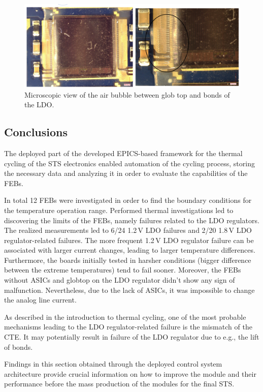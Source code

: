 \begin{figure}[!h]
\centering
\includegraphics[width=0.8\columnwidth]{Chapter4/images/FEB_81_LDO_lift.png}
\caption{Microscopic view of the air bubble between glob top and bonds of the \gls{LDO}.}
\label{fig_ldo_lift}
\end{figure}
\newpage
\subsection{Conclusions}
The deployed part of the developed EPICS-based framework for the thermal cycling of the \gls{STS} electronics enabled automation of the cycling process, storing the necessary data and analyzing it in order to evaluate the capabilities of the \glspl{FEB}. 

In total 12 \glspl{FEB} were investigated in order to find the boundary conditions for the temperature operation range. Performed thermal investigations led to discovering the limits of the \glspl{FEB}, namely failures related to the \gls{LDO} regulators. The realized measurements led to 6/24 1.2\,V \gls{LDO} failures and 2/20 1.8\,V \gls{LDO} regulator-related failures. The more frequent 1.2\,V \gls{LDO} regulator failure can be associated with larger current changes, leading to larger temperature differences. Furthermore, the boards initially tested in harsher conditions (bigger difference between the extreme temperatures) tend to fail sooner. Moreover, the \glspl{FEB} without \glspl{ASIC} and globtop on the LDO regulator didn’t show any sign of malfunction. Nevertheless, due to the lack of \glspl{ASIC}, it was impossible to change the analog line current.

As described in the introduction to thermal cycling, one of the most probable mechanisms leading to the \gls{LDO} regulator-related failure is the mismatch of the \gls{CTE}. It may potentially result in failure of the \gls{LDO} regulator due to e.g., the lift of bonds.

Findings in this section obtained through the deployed control system architecture provide crucial information on how to improve the module and their performance before the mass production of the modules for the final \gls{STS}. 



\newpage
